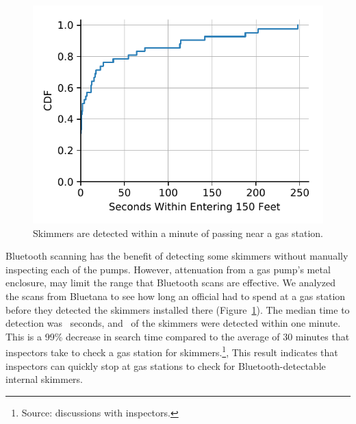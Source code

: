 \begin{figure}
\centering
\includegraphics[width=\linewidth]{skimmer/plots/cdf_skim_discover_time.pdf}
\caption{
\label{fig:skim_discover_time}
 Skimmers are detected within a minute of passing near a gas station.
}
\end{figure}

Bluetooth scanning has the benefit of detecting some skimmers without manually inspecting each of the pumps.
%
However, attenuation from a gas pump's metal enclosure, may limit the range that Bluetooth scans are effective.
%
We analyzed the scans from Bluetana to see how long an official had to spend at a gas station before they detected the skimmers installed there (Figure~\ref{fig:skim_discover_time}).
%
%
The median time to detection was \skimmerdetectiontimemedian~seconds, and \skimmeroneminutepercent~of the skimmers were detected within one minute.
%
This is a 99\% decrease in search time compared to the average of 30 minutes
that inspectors take to check a gas station for skimmers.\footnote{Source:
discussions with inspectors.},
%
This result indicates that inspectors can quickly stop at gas stations to check for Bluetooth-detectable internal skimmers.

%
%



